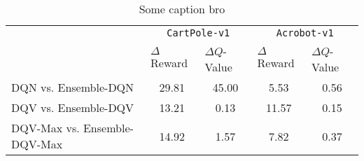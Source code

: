 \documentclass{article}
\begin{document}
\begin{table}
\centering
\setlength{\extrarowheight}{0pt}
\addtolength{\extrarowheight}{\aboverulesep}
\addtolength{\extrarowheight}{\belowrulesep}
\setlength{\aboverulesep}{0pt}
\setlength{\belowrulesep}{0pt}
\caption{Some caption bro}
\label{table:results_diff}
\begin{tabular}{lcccc}
\toprule
\multicolumn{1}{c}{\multirow{2}{*}{}} & \multicolumn{2}{c}{\texttt{CartPole-v1}}                                  & \multicolumn{2}{c}{\texttt{Acrobot-v1}}                                      \\
\cmidrule(l){2-5}
\multicolumn{1}{c}{}                  & \multicolumn{1}{l}{$\Delta$Reward} & \multicolumn{1}{l}{$\Delta Q$-Value} & \multicolumn{1}{l}{$\Delta$Reward}   & \multicolumn{1}{l}{$\Delta Q$-Value}  \\
\midrule
DQN vs. Ensemble-DQN                  & 29.81                              & {\cellcolor[rgb]{1,0.988,0.62}}45.00 & {\cellcolor[rgb]{1,0.988,0.62}}5.53  & {\cellcolor[rgb]{1,0.988,0.62}}0.56   \\
\midrule
DQV vs. Ensemble-DQV                  & 13.21                              & 0.13                                 & {\cellcolor[rgb]{1,0.988,0.62}}11.57 & {\cellcolor[rgb]{1,0.988,0.62}}0.15   \\
\midrule
DQV-Max vs. Ensemble-DQV-Max          & 14.92                              & 1.57                                 & {\cellcolor[rgb]{1,0.988,0.62}}7.82  & {\cellcolor[rgb]{1,0.988,0.62}}0.37   \\
\bottomrule
\end{tabular}
\end{table}
\end{document}
